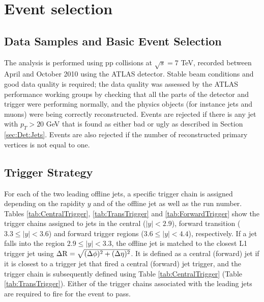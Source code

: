 \section {Event selection}
\label{sec:GBJ2:EvtSel}
\subsection{Data Samples and Basic Event Selection}
The analysis is performed using pp collisions at $\sqrt{s}=7$ TeV, recorded between April and October 2010 using the ATLAS detector.
Stable beam conditions and good data quality is required; the data quality was assessed by the ATLAS performance working groups by checking that all the parts of the detector and trigger were performing normally, and the physics objects (for instance jets and muons) were being correctly reconstructed. 
Events are rejected if there is any jet with $p_T>20$ GeV that is found as either bad or ugly as described in Section \ref{sec:Det:Jets}. 
Events are also rejected if the number of reconstructed primary vertices is not equal to one.


\subsection{Trigger Strategy}

For each of the two leading offline jets, a specific trigger chain is assigned depending on the rapidity $y$ and \pt{} of the offline jet as well as the run number.
Tables \ref{tab:CentralTrigger}, \ref{tab:TransTrigger} and \ref{tab:ForwardTrigger} show the trigger chains assigned to jets in the central ($|y|<2.9$), forward transition ($3.3\le|y|<3.6$) and forward trigger regions ($3.6\le|y|<4.4$), respectively.
If a jet falls into the region $2.9\le|y|<3.3$, the offline jet is matched to the closest L1 trigger jet using $\mbox{$\Delta{\rm R}$}{}=\sqrt{(\mbox{$\Delta{\rm \phi}$}{})^2 + (\mbox{$\Delta{\rm \eta}$}{})^2}$.
It is defined as a central (forward) jet  if it is closest to a trigger jet that fired a central (forward) jet trigger, and the trigger chain is subsequently defined using Table \ref{tab:CentralTrigger} (Table \ref{tab:TransTrigger}).
Either of the trigger chains associated with the leading jets are required to fire for the event to pass.

